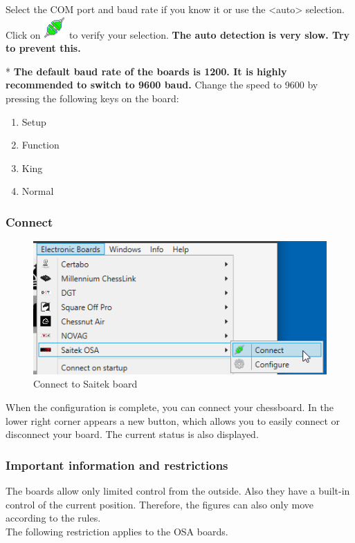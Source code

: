 \documentclass[11pt,a4paper]{article}
\begin{document}
Select the COM port and baud rate if you know it or use the <auto> selection. 
Click on \includegraphics[scale=0.5]{connect.png} to verify your selection. \textbf{The auto detection is very slow. Try to prevent this.}

{\color{red}*} \textbf{The default baud rate of the boards is 1200. It is highly recommended to switch to 9600 baud.} Change the speed to 9600 by pressing the following keys on the board:

\begin{enumerate}
	\item {\color{blue}Setup}
 	\item {\color{blue}Function}
	\item {\color{blue}King}
	\item {\color{blue}Normal}
\end{enumerate}

\subsubsection{Connect}
\begin{figure}[H]
	\centering
	\includegraphics[scale=1.0]{Saitek3.png}
	\caption{Connect to Saitek board}
	\label{fig:Saitek3}
\end{figure}
When the configuration is complete, you can connect your chessboard.
In the lower right corner appears a new button, which allows you to easily connect or disconnect your board. The current status is also displayed.

\subsubsection{Important information and restrictions} \label{InformationOSA}
The boards allow only limited control from the outside. Also they have a built-in control of the current position. Therefore, the figures can also only move according to the rules.\\
The following restriction applies to the OSA boards.
\end{document}

